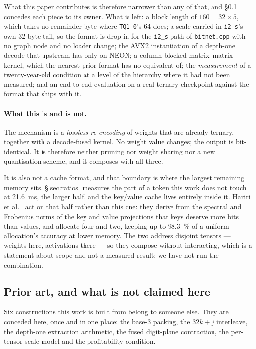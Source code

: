 \documentclass[11pt,a4paper]{article}
\newcommand{\code}[1]{\texttt{#1}}
\begin{document}
What this paper contributes is therefore narrower than any of that, and
\S\ref{sec:priorart} concedes each piece to its owner. What is left: a block
length of $160=32\times5$, which takes no remainder byte where \code{TQ1\_0}'s
\num{64} does; a scale carried in \code{i2\_s}'s own 32-byte tail, so the
format is drop-in for the \code{i2\_s} path of \code{bitnet.cpp} with no graph
node and no loader change; the AVX2 instantiation of a depth-one decode that
upstream has only on NEON; a column-blocked matrix--matrix kernel, which the
nearest prior format has no equivalent of; the \emph{measurement} of a
twenty-year-old condition at a level of the hierarchy where it had not been
measured; and an end-to-end evaluation on a real ternary checkpoint against the
format that ships with it.

\paragraph{What this is and is not.}
The mechanism is a \emph{lossless re-encoding} of weights that are already
ternary, together with a decode-fused kernel. No weight value changes; the
output is bit-identical. It is therefore neither pruning nor weight sharing nor
a new quantisation scheme, and it composes with all three.

It is also not a cache format, and that boundary is where the largest remaining
memory sits. \S\ref{sec:ratios} measures the part of a token this work does not
touch at \SI{21.6}{\milli\second}, the larger half, and the key/value cache
lives entirely inside it. Hariri et al.~\cite{spectralkv} act on that half rather
than this one: they derive from the spectral and Frobenius norms of the key and
value projections that keys deserve more bits than values, and allocate four and
two, keeping up to \SI{98.3}{\percent} of a uniform allocation's accuracy at
lower memory. The two address disjoint tensors --- weights here, activations
there --- so they compose without interacting, which is a statement about scope
and not a measured result; we have not run the combination.

\subsection{Prior art, and what is not claimed here}\label{sec:priorart}

Six constructions this work is built from belong to someone else. They are
conceded here, once and in one place: the base-3 packing, the $32k+j$
interleave, the depth-one extraction arithmetic, the fused digit-plane
contraction, the per-tensor scale model and the profitability condition.
\end{document}
